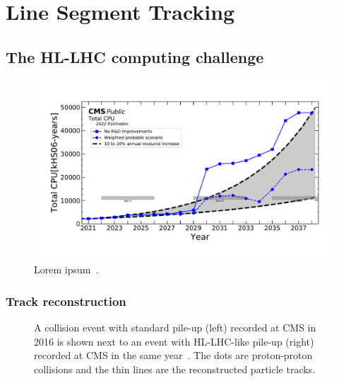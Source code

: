 \chapter{Line Segment Tracking}

\section{The HL-LHC computing challenge}

\begin{figure}[htb]
  \centering
  \includegraphics[width=.9\textwidth]{fig/lst/cpu_cms2022.pdf}
  \caption{Lorem ipsum~\cite{CMSComputingReport2022}.}
  \label{fig:cpu_projections}
\end{figure}

\subsection{Track reconstruction}

\begin{figure}[!htb]
  \centering
  \qquad
  \caption{
      A collision event with standard pile-up (left) recorded at CMS in 2016 is shown next to an event with HL-LHC-like pile-up (right) recorded at CMS in the same year~\cite{NormalPU2016, HighPU2016}.
      The dots are proton-proton collisions and the thin lines are the reconstructed particle tracks.
  }
  \label{fig:pileup}
\end{figure}


